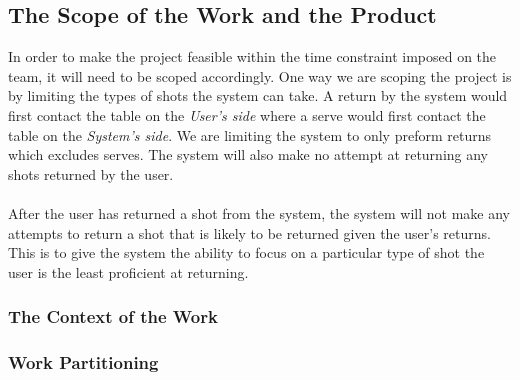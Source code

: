 \documentclass[11pt]{article}
\begin{document}
\subsection{The Scope of the Work and the Product}
In order to make the project feasible within the time constraint imposed on the team, it will need to be scoped accordingly. One way we are scoping the project is by limiting the types of shots the system can take. A return by the system would first contact the table on the \textit{User's side} where a serve would first contact the table on the \textit{System's side}. We are limiting the system to only preform returns which excludes serves. The system will also make no attempt at returning any shots returned by the user. \\\\
After the user has returned a shot from the system, the system will not make any attempts to return a shot that is likely to be returned given the user's returns. This is to give the system the ability to focus on a particular type of shot the user is the least proficient at returning.
\subsubsection{The Context of the Work}
\subsubsection{Work Partitioning}
\end{document}
